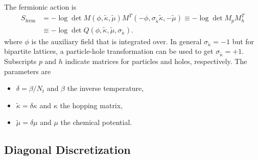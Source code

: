 \documentclass[a4paper, fleqn, twoside, notitlepage]{scrartcl}
\begin{document}
The fermionic action is
\begin{align}
  S_\text{ferm} &= - \log \det M(\phi, \tilde{\kappa}, \tilde{\mu}) M^T(-\phi, \sigma_{\tilde{\kappa}}\tilde{\kappa}, -\tilde{\mu}) \equiv - \log \det M_p M_h^T\label{eq:ferm_action_v1}\\
  &\equiv - \log \det Q(\phi, \tilde{\kappa}, \tilde{\mu}, \sigma_{\tilde{\kappa}}).\label{eq:ferm_action_v2}
\end{align}
where $\phi$ is the auxiliary field that is integrated over. In general $\sigma_{\tilde{\kappa}} = -1$ but for bipartite lattices, a particle-hole transformation can be used to get $\sigma_{\tilde{\kappa}} = +1$. Subscripts $p$ and $h$ indicate matrices for particles and holes, respectively.
The parameters are
\begin{itemize}
\item $\delta = \beta / N_t$ and $\beta$ the inverse temperature,
\item $\tilde{\kappa} = \delta\kappa$ and $\kappa$ the hopping matrix,
\item $\tilde{\mu} = \delta\mu$ and $\mu$ the chemical potential.
\end{itemize}

\subsection{Diagonal Discretization}\label{sec:dia_disc}
\end{document}
